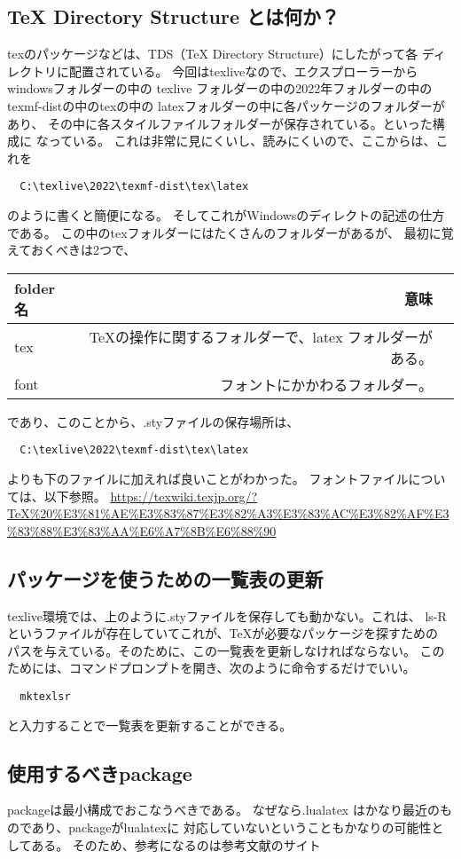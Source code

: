 \documentclass{ltjsarticle}
\begin{document}
\subsection{TeX Directory Structure とは何か？}
texのパッケージなどは、TDS（TeX Directory Structure）にしたがって各
ディレクトリに配置されている。
今回はtexliveなので、エクスプローラーからwindowsフォルダーの中の
texlive フォルダーの中の2022年フォルダーの中のtexmf-distの中のtexの中の
latexフォルダーの中に各パッケージのフォルダーがあり、
その中に各スタイルファイルフォルダーが保存されている。といった構成に
なっている。
これは非常に見にくいし、読みにくいので、ここからは、これを
\begin{verbatim}
  C:\texlive\2022\texmf-dist\tex\latex
\end{verbatim}
のように書くと簡便になる。
そしてこれがWindowsのディレクトの記述の仕方である。
この中のtexフォルダーにはたくさんのフォルダーがあるが、
最初に覚えておくべきは2つで、
\begin{center}
  \begin{tabular}{lrr} \hline
    folder名  & 意味                                \\ \hline
    tex       & TeXの操作に関するフォルダーで、latex フォルダーがある。  \\
    font      & フォントにかかわるフォルダー。                  \\ \hline
  \end{tabular}
\end{center}
であり、このことから、.styファイルの保存場所は、
\begin{verbatim}
  C:\texlive\2022\texmf-dist\tex\latex
\end{verbatim}
よりも下のファイルに加えれば良いことがわかった。
フォントファイルについては、以下参照。
\url{https://texwiki.texjp.org/?TeX%20%E3%81%AE%E3%83%87%E3%82%A3%E3%83%AC%E3%82%AF%E3%83%88%E3%83%AA%E6%A7%8B%E6%88%90}
\subsection{パッケージを使うための一覧表の更新}
texlive環境では、上のように.styファイルを保存しても動かない。これは、
ls-Rというファイルが存在していてこれが、TeXが必要なパッケージを探すための
パスを与えている。そのために、この一覧表を更新しなければならない。
このためには、コマンドプロンプトを開き、次のように命令するだけでいい。
\begin{verbatim}
  mktexlsr
\end{verbatim}
と入力することで一覧表を更新することができる。
\subsection{使用するべきpackage}
packageは最小構成でおこなうべきである。
なぜなら.lualatex  はかなり最近のものであり、packageがlualatexに
対応していないということもかなりの可能性としてある。
そのため、参考になるのは参考文献のサイト
\end{document}
